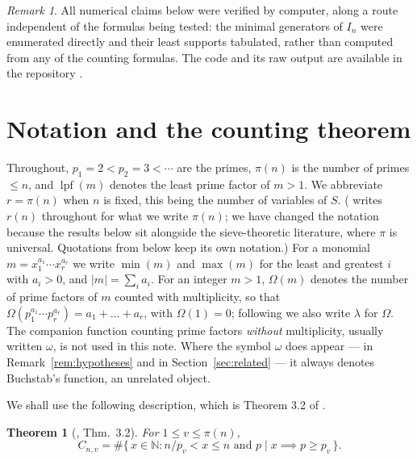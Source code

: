 \documentclass[a4paper,11pt,oneside,reqno]{amsart}
\theoremstyle{definition}
\theoremstyle{remark}
\newtheorem{remark}[definition]{Remark}
\theoremstyle{plain}
\newtheorem{theorem}[definition]{Theorem}
\newcommand{\NN}{\mathbb{N}}
\newcommand{\lpf}{\operatorname{lpf}}
\newcommand{\Om}{\Omega}
\begin{document}
\begin{remark}
  All numerical claims below were verified by computer, along a route
  independent of the formulas being tested: the minimal generators of \(I_n\)
  were enumerated directly and their least supports tabulated, rather than
  computed from any of the counting formulas. The code and its raw output are
  available in the repository \cite{gitrepo}.
\end{remark}

\section{Notation and the counting theorem}\label{sec:prelim}

Throughout, \(p_1 = 2 < p_2 = 3 < \cdots\) are the primes, \(\pi(n)\) is the number of
primes \(\le n\), and \(\lpf(m)\) denotes the least prime factor of \(m > 1\).
We abbreviate \(r = \pi(n)\) when \(n\) is fixed, this being the number of
variables of \(S\). (\cite{Snellman2000} writes \(r(n)\) throughout for what we
write \(\pi(n)\); we have changed the notation because the results below sit
alongside the sieve-theoretic literature, where \(\pi\) is universal. Quotations
from \cite{Snellman2000} below keep its own notation.)
For a monomial \(m = x_1^{a_1}\cdots x_r^{a_r}\) we write \(\min(m)\) and
\(\max(m)\) for the least and greatest \(i\) with \(a_i > 0\), and
\(|m|=\sum_i a_i\). For an integer \(m > 1\), \(\Om(m)\) denotes the number of
prime factors of \(m\) counted with multiplicity, so that
\(\Om(p_1^{a_1}\cdots p_r^{a_r}) = a_1+\dots+a_r\), with \(\Om(1) = 0\); following
\cite{Snellman2000} we also write \(\lambda\) for \(\Om\). The companion
function counting prime factors \emph{without} multiplicity, usually written
\(\omega\), is not used in this note. Where the symbol \(\omega\) does appear
--- in Remark~\ref{rem:hypotheses} and in Section~\ref{sec:related} --- it
always denotes Buchstab's function, an unrelated object.

We shall use the following description, which is Theorem 3.2 of
\cite{Snellman2000}.

\begin{theorem}[\cite{Snellman2000}, Thm.~3.2]\label{thm:S32}
  For \(1 \le v \le \pi(n)\),
  \[
    C_{n,v} = \#\{\,x \in \NN : n/p_v < x \le n \text{ and }
    p \mid x \implies p \ge p_v \,\}.
  \]
\end{theorem}
\end{document}
